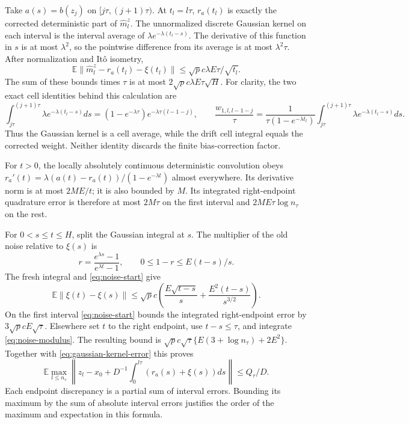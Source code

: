 \documentclass[a4paper,11pt]{article}
\theoremstyle{remark}
\newcommand{\E}{\mathbb E}
\newcommand{\norm}[1]{\lVert#1\rVert}
\begin{document}
Take $a(s)=b(z_j)$ on $[j\tau,(j+1)\tau)$. At $t_l=l\tau$,
$r_a(t_l)$ is exactly the corrected deterministic part of
$\widehat m_l^z$. The unnormalized discrete Gaussian kernel on each
interval is the interval average of
$\lambda e^{-\lambda(t_l-s)}$. The derivative of this function in $s$
is at most $\lambda^2$, so the pointwise difference from its average is
at most $\lambda^2\tau$. After normalization and It\^o isometry,
\begin{equation}\label{eq:gaussian-kernel-error}
 \E\norm{\widehat m_l^z-r_a(t_l)-\xi(t_l)}
 \le\sqrt p c\lambda E\tau/\sqrt{t_l}.
\end{equation}
The sum of these bounds times $\tau$ is at most
$2\sqrt p c\lambda E\tau\sqrt H$.
For clarity, the two exact cell identities behind this calculation are
\[
 \int_{j\tau}^{(j+1)\tau}\lambda e^{-\lambda(t_l-s)}ds
  =(1-e^{-\lambda\tau})e^{-\lambda\tau(l-1-j)},\qquad
 \frac{w_{1,l,l-1-j}}{\tau}
  =\frac{1}{\tau(1-e^{-\lambda t_l})}
       \int_{j\tau}^{(j+1)\tau}\lambda e^{-\lambda(t_l-s)}ds.
\]
Thus the Gaussian kernel is a cell average, while the drift cell integral
equals the corrected weight. Neither identity discards the finite
bias-correction factor.

For $t>0$, the locally absolutely continuous deterministic convolution obeys
$r_a'(t)=\lambda(a(t)-r_a(t))/(1-e^{-\lambda t})$ almost everywhere.
Its derivative norm is at most $2ME/t$; it is also bounded by $M$.
Its integrated right-endpoint quadrature error is therefore at most
$2M\tau$ on the first interval and $2ME\tau\log n_\tau$ on the rest.

For $0<s\le t\le H$, split the Gaussian integral at $s$. The multiplier
of the old noise relative to $\xi(s)$ is
\[
 r=\frac{e^{\lambda s}-1}{e^{\lambda t}-1},\qquad
 0\le1-r\le E(t-s)/s.
\]
The fresh integral and \eqref{eq:noise-start} give
\begin{equation}\label{eq:noise-modulus}
 \E\norm{\xi(t)-\xi(s)}\le\sqrt p c
 \left(\frac{E\sqrt{t-s}}s+\frac{E^2(t-s)}{s^{3/2}}\right).
\end{equation}
On the first interval \eqref{eq:noise-start} bounds the integrated
right-endpoint error by $3\sqrt p cE\sqrt\tau$. Elsewhere set $t$ to
the right endpoint, use $t-s\le\tau$, and integrate
\eqref{eq:noise-modulus}. The resulting bound is
$\sqrt p c\sqrt\tau\{E(3+\log n_\tau)+2E^2\}$.
Together with \eqref{eq:gaussian-kernel-error} this proves
\begin{equation}\label{eq:integral-residual}
 \E\max_{l\le n_\tau}\left\|z_l-x_0+
       D^{-1}\int_0^{l\tau}(r_a(s)+\xi(s))ds\right\|\le Q_\tau/D.
\end{equation}
Each endpoint discrepancy is a partial sum of interval errors. Bounding
its maximum by the sum of absolute interval errors justifies the order
of the maximum and expectation in this formula.
\end{document}
